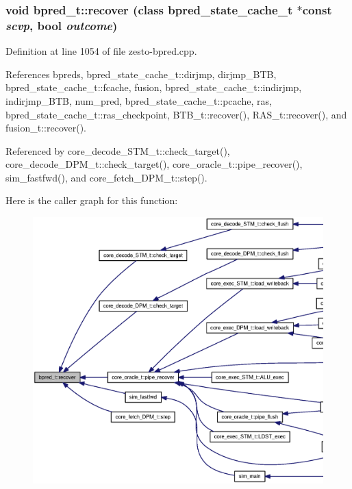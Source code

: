 \subsubsection[{recover}]{\setlength{\rightskip}{0pt plus 5cm}void bpred\_\-t::recover (class {\bf bpred\_\-state\_\-cache\_\-t} $\ast$const  {\em scvp}, \/  bool {\em outcome})}\label{classbpred__t_d355ab253a6029ba45cc4fa10229081d}




Definition at line 1054 of file zesto-bpred.cpp.

References bpreds, bpred\_\-state\_\-cache\_\-t::dirjmp, dirjmp\_\-BTB, bpred\_\-state\_\-cache\_\-t::fcache, fusion, bpred\_\-state\_\-cache\_\-t::indirjmp, indirjmp\_\-BTB, num\_\-pred, bpred\_\-state\_\-cache\_\-t::pcache, ras, bpred\_\-state\_\-cache\_\-t::ras\_\-checkpoint, BTB\_\-t::recover(), RAS\_\-t::recover(), and fusion\_\-t::recover().

Referenced by core\_\-decode\_\-STM\_\-t::check\_\-target(), core\_\-decode\_\-DPM\_\-t::check\_\-target(), core\_\-oracle\_\-t::pipe\_\-recover(), sim\_\-fastfwd(), and core\_\-fetch\_\-DPM\_\-t::step().

Here is the caller graph for this function:\nopagebreak
\begin{figure}[H]
\begin{center}
\leavevmode
\includegraphics[width=420pt]{classbpred__t_d355ab253a6029ba45cc4fa10229081d_icgraph}
\end{center}
\end{figure}
